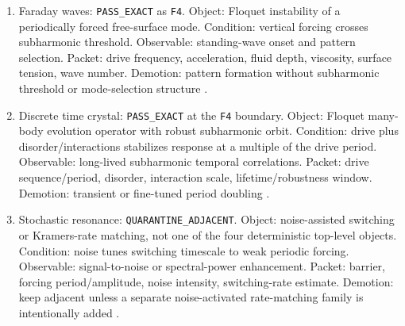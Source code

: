 \documentclass[aps,pra,reprint,nofootinbib]{revtex4-2}
\begin{document}
\begin{enumerate}
\item Faraday waves: \texttt{PASS\_EXACT} as \texttt{F4}. Object: Floquet instability of a periodically forced free-surface mode. Condition: vertical forcing crosses subharmonic threshold. Observable: standing-wave onset and pattern selection. Packet: drive frequency, acceleration, fluid depth, viscosity, surface tension, wave number. Demotion: pattern formation without subharmonic threshold or mode-selection structure \cite{rajchenbach2021faraday}.
\item Discrete time crystal: \texttt{PASS\_EXACT} at the \texttt{F4} boundary. Object: Floquet many-body evolution operator with robust subharmonic orbit. Condition: drive plus disorder/interactions stabilizes response at a multiple of the drive period. Observable: long-lived subharmonic temporal correlations. Packet: drive sequence/period, disorder, interaction scale, lifetime/robustness window. Demotion: transient or fine-tuned period doubling \cite{zhang2017observation,choi2017observation,sacha2018review,khemani2016phase,else2016floquet,yao2017discrete}.
\item Stochastic resonance: \texttt{QUARANTINE\_ADJACENT}. Object: noise-assisted switching or Kramers-rate matching, not one of the four deterministic top-level objects. Condition: noise tunes switching timescale to weak periodic forcing. Observable: signal-to-noise or spectral-power enhancement. Packet: barrier, forcing period/amplitude, noise intensity, switching-rate estimate. Demotion: keep adjacent unless a separate noise-activated rate-matching family is intentionally added \cite{benzi1983mechanism}.
\end{enumerate}


\end{document}
